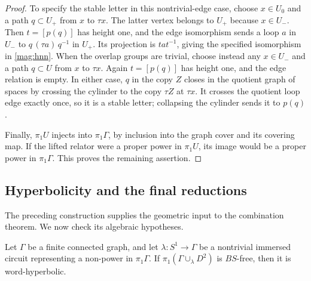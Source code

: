 \begin{proof}
To specify the stable letter in this nontrivial-edge case,
choose $x\in U_0$ and a path $q\subset U_+$ from $x$ to $\tau x$.
The latter vertex belongs to $U_+$ because $x\in U_-$.
Then $t=[p(q)]$ has height one, and the edge isomorphism sends a
loop $a$ in $U_-$ to $q\,(\tau a)\,q^{-1}$ in $U_+$.
Its projection is $tat^{-1}$, giving the specified isomorphism
in \eqref{mag:hnn}.
When the overlap groups are trivial, choose instead any
$x\in U_-$ and a path $q\subset U$ from $x$ to $\tau x$.
Again $t=[p(q)]$ has height one, and the edge relation is empty.
In either case, $q$ in the copy $Z$ closes in the quotient graph
of spaces by crossing the cylinder to the copy $\tau Z$ at
$\tau x$.  It crosses the quotient loop edge exactly once,
so it is a stable letter; collapsing the cylinder sends it to
$p(q)$.

Finally, $\pi_1U$ injects into $\pi_1\Gamma$, by inclusion into
the graph cover and its covering map.  If the lifted relator
were a proper power in $\pi_1U$, its image would be a proper
power in $\pi_1\Gamma$.  This proves the remaining assertion.
\end{proof}

\subsection{Hyperbolicity and the final reductions}

The preceding construction supplies the geometric input to the
combination theorem.  We now check its algebraic hypotheses.

\begin{proposition}\label{mag:nonpower-hyperbolicity}
Let $\Gamma$ be a finite connected graph, and let
$\lambda\colon S^1\to\Gamma$ be a nontrivial immersed circuit
representing a non-power in $\pi_1\Gamma$.
If $\pi_1(\Gamma\cup_\lambda D^2)$ is $BS$-free, then it is
word-hyperbolic.
\end{proposition}

